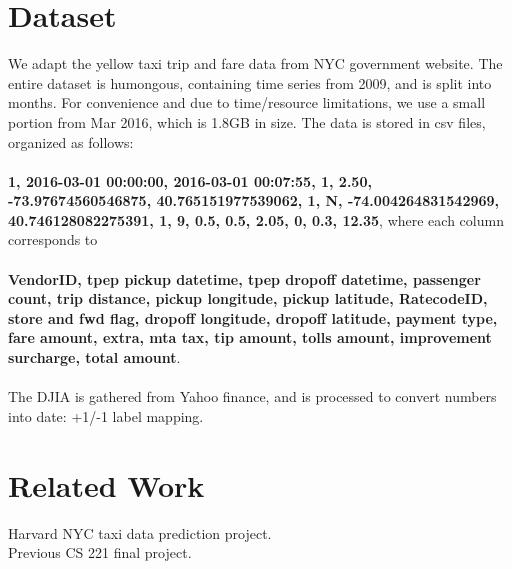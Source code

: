 \documentclass[a4paper]{article}
\begin{document}
\section{Dataset}
We adapt the yellow taxi trip and fare data from NYC government website\cite{gov}. The entire dataset is humongous, containing time series from 2009, and is split into months. For convenience and due to time/resource limitations, we use a small portion from Mar 2016, which is 1.8GB in size. The data is stored in csv files, organized as follows:\\\\
\textbf{1, 2016-03-01 00:00:00, 2016-03-01 00:07:55, 1, 2.50, -73.97674560546875, 40.765151977539062, 1, N, -74.004264831542969, 40.746128082275391, 1, 9, 0.5, 0.5, 2.05, 0, 0.3, 12.35}, where each column corresponds to \\ \\
\textbf{VendorID, tpep pickup datetime, tpep dropoff datetime, passenger count, trip distance, pickup longitude, pickup latitude, RatecodeID, store and fwd flag, dropoff longitude, dropoff latitude, payment type, fare amount, extra, mta tax, tip amount, tolls amount, improvement surcharge, total amount}.\\\\
The DJIA is gathered from Yahoo finance\cite{yahoo}, and is processed to convert numbers into date: +1/-1 label mapping.
\section{Related Work}
Harvard NYC taxi data prediction project.\cite{harvard}\\
Previous CS 221 final project.\cite{221}


\end{document}
